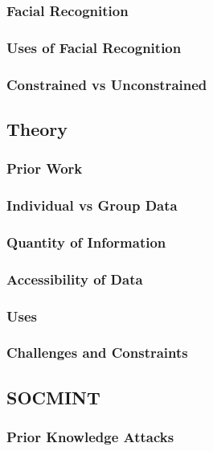 \documentclass{article}
\begin{document}
\subsubsection{Facial Recognition}

\subsubsection{Uses of Facial Recognition}

\subsubsection{Constrained vs Unconstrained}

\subsection{Theory}
\subsubsection{Prior Work}

\subsubsection{Individual vs Group Data}

\subsubsection{Quantity of Information}

\subsubsection{Accessibility of Data}

\subsubsection{Uses}

\subsubsection{Challenges and Constraints}

\subsection{SOCMINT}
\subsubsection{Prior Knowledge Attacks}
\end{document}
